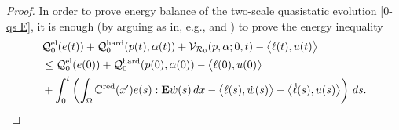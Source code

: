 \documentclass[reqno,10pt]{amsart}
\numberwithin{equation}{section}
\theoremstyle{remark}
\newcommand{\C}{\mathbb{C}}
\newcommand{\calQ}{\mathcal{Q}}
\newcommand{\calR}{\mathcal{R}}
\newcommand{\calV}{\mathcal{V}}
\newcommand{\E}{{\bf E}}
\newcommand{\red}[1]{#1^{\rm red}}
\begin{document}
\begin{proof}
In order to prove energy balance of the two-scale quasistatic evolution \ref{0-qs E}, it is enough (by arguing as in, e.g., \cite[Theorem 4.7]{DalMaso.DeSimone.Mora.2006} and \cite[Theorem 2.7]{Francfort.Giacomini.2012}) to prove the energy inequality
\begin{align} \label{main result dr - step 3 inequality}
\begin{split}
	& \calQ^{\rm el}_{0}(e(t)) + \calQ^{\rm hard}_{0}(p(t), \alpha(t)) 
	+ \calV_{\calR_{0}}(p, \alpha; 0, t) 
	- \big\langle \ell(t), u(t) \big\rangle
	\\& \leq \calQ^{\rm el}_{0}(e(0)) + \calQ^{\rm hard}_{0}(p(0), \alpha(0)) 
	- \big\langle \ell(0), u(0) \big\rangle 
	\\& + \int_0^t \left( \int_{\Omega} \red{\C}(x') e(s) : {\E}\dot{w}(s) \,dx - \big\langle \ell(s), \dot{w}(s) \big\rangle - \big\langle \dot{\ell}(s), u(s) \big\rangle \right) \,ds.
\end{split}
\end{align}


\end{proof}
\end{document}
